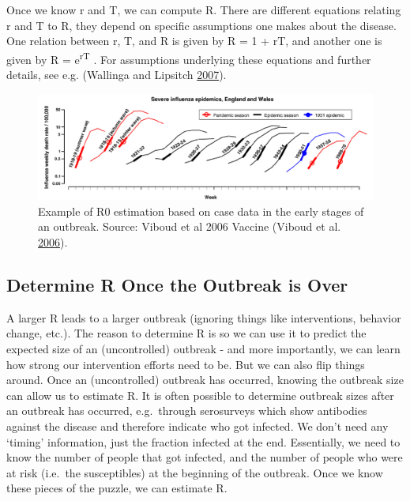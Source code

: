 \documentclass[]{book}
\theoremstyle{definition}
\theoremstyle{definition}
\theoremstyle{definition}
\theoremstyle{remark}
\begin{document}
Once we know r and T, we can compute R. There are different equations
relating r and T to R, they depend on specific assumptions one makes
about the disease. One relation between r, T, and R is given by R = 1 +
rT, and another one is given by R = e\textsuperscript{rT} . For
assumptions underlying these equations and further details, see e.g.
(Wallinga and Lipsitch \protect\hyperlink{ref-wallinga07}{2007}).

\begin{figure}
\centering
\includegraphics{./images/viboud-R0.png}
\caption{\label{fig:viboudR0}Example of R0 estimation based on case data in
the early stages of an outbreak. Source: Viboud et al 2006 Vaccine
(Viboud et al. \protect\hyperlink{ref-viboud06}{2006}).}
\end{figure}

\hypertarget{determine-r-once-the-outbreak-is-over}{%
\subsection{Determine R Once the Outbreak is
Over}\label{determine-r-once-the-outbreak-is-over}}

A larger R leads to a larger outbreak (ignoring things like
interventions, behavior change, etc.). The reason to determine R is so
we can use it to predict the expected size of an (uncontrolled) outbreak
- and more importantly, we can learn how strong our intervention efforts
need to be. But we can also flip things around. Once an (uncontrolled)
outbreak has occurred, knowing the outbreak size can allow us to
estimate R. It is often possible to determine outbreak sizes after an
outbreak has occurred, e.g.~through serosurveys which show antibodies
against the disease and therefore indicate who got infected. We don't
need any `timing' information, just the fraction infected at the end.
Essentially, we need to know the number of people that got infected, and
the number of people who were at risk (i.e.~the susceptibles) at the
beginning of the outbreak. Once we know these pieces of the puzzle, we
can estimate R.
\end{document}
